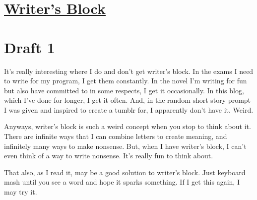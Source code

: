 \documentclass[12pt]{article}[titlepage]
\newcommand{\1}{\={a}}
\newcommand{\2}{\={e}}
\newcommand{\3}{\={\i}}
\newcommand{\4}{\=o}
\newcommand{\5}{\=u}
\newcommand{\6}{\={A}}
\renewcommand{\,}{\textsuperscript{,}}
\begin{document}
\doublespacing
\section{\href{writers-block-4.tex}{Writer's Block}}
\section{Draft 1}
It's really interesting where I do and don't get writer's block.
In the exams I need to write for my program, I get them constantly.
In the novel I'm writing for fun but also have committed to in some respects, I get it occasionally.
In this blog, which I've done for longer, I get it often.
And, in the random short story prompt I was given and inspired to create a tumblr for, I apparently don't have it.
Weird.

Anyways, writer's block is such a weird concept when you stop to think about it.
There are infinite ways that I can combine letters to create meaning, and infinitely many ways to make nonsense.
But, when I have writer's block, I can't even think of a way to write nonsense.
It's really fun to think about.

That also, as I read it, may be a good solution to writer's block.
Just keyboard mash until you see a word and hope it sparks something.
If I get this again, I may try it.
\end{document}
